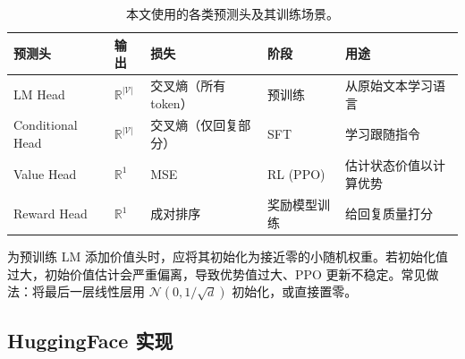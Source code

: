 \begin{table}[ht!]
\centering\small
\caption{本文使用的各类预测头及其训练场景。}
\noindent\begin{tabularx}{\linewidth}{@{}l Z{0.48} Z{1.29} Z{0.61} Z{1.62}@{}}
\toprule
\textbf{预测头} & \textbf{输出} & \textbf{损失} & \textbf{阶段} & \textbf{用途} \\
\midrule
LM Head & $\mathbb{R}^{|\mathcal{V}|}$ & 交叉熵（所有 token） & 预训练 & 从原始文本学习语言 \\
Conditional Head & $\mathbb{R}^{|\mathcal{V}|}$ & 交叉熵（仅回复部分） & SFT & 学习跟随指令 \\
Value Head & $\mathbb{R}^1$ & MSE & RL (PPO) & 估计状态价值以计算优势 \\
Reward Head & $\mathbb{R}^1$ & 成对排序 & 奖励模型训练 & 给回复质量打分 \\
\bottomrule
\end{tabularx}
\end{table}

\begin{warningbox}[预测头初始化很重要]
为预训练 LM 添加价值头时，应将其初始化为接近零的小随机权重。若初始化值过大，初始价值估计会严重偏离，导致优势值过大、PPO 更新不稳定。常见做法：将最后一层线性层用 $\mathcal{N}(0, 1/\sqrt{d})$ 初始化，或直接置零。
\end{warningbox}

\newpage
\subsection{HuggingFace 实现}
\label{huggingface-implementation}

